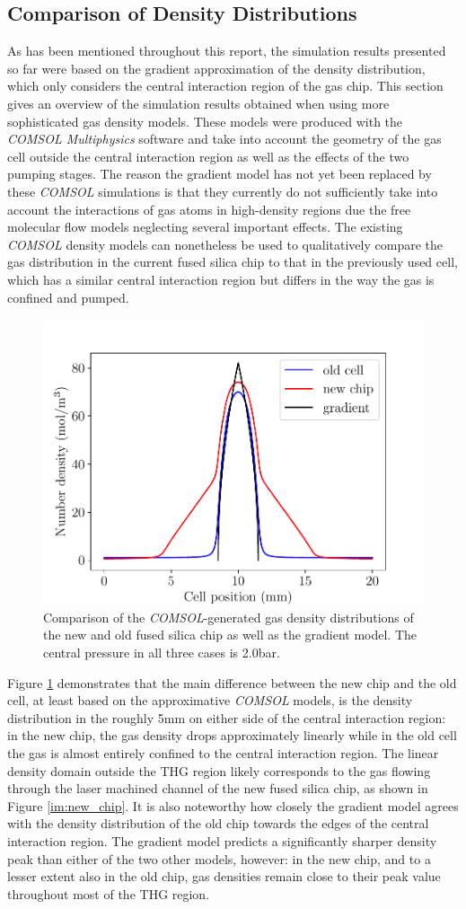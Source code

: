 \documentclass[a4paper]{jpconf}
\begin{document}
\subsection{Comparison of Density Distributions}
As has been mentioned throughout this report, the simulation results presented so far were based on the gradient approximation of the density distribution, which only considers the central interaction region of the gas chip. This section gives an overview of the simulation results obtained when using more sophisticated gas density models. These models were produced with the \textit{COMSOL Multiphysics} software and take into account the geometry of the gas cell outside the central interaction region as well as the effects of the two pumping stages. The reason the gradient model has not yet been replaced by these \textit{COMSOL} simulations is that they currently do not sufficiently take into account the interactions of gas atoms in high-density regions due the free molecular flow models neglecting several important effects. The existing \textit{COMSOL} density models can nonetheless be used to qualitatively compare the gas distribution in the current fused silica chip to that in the previously used cell, which has a similar central interaction region but differs in the way the gas is confined and pumped. \par 
\begin{figure}[h]
\centering
\includegraphics[width=0.5 \textwidth]{im/old_new_comp}
\caption{Comparison of the \textit{COMSOL}-generated gas density distributions of the new and old fused silica chip as well as the gradient model. The central pressure in all three cases is 2.0bar.}\label{im:dens}
\end{figure}
Figure \ref{im:dens} demonstrates that the main difference between the new chip and the old cell, at least based on the approximative \textit{COMSOL} models, is the density distribution in the roughly 5mm on either side of the central interaction region: in the new chip, the gas density drops approximately linearly while in the old cell the gas is almost entirely confined to the central interaction region. The linear density domain outside the THG region likely corresponds to the gas flowing through the laser machined channel of the new fused silica chip, as shown in Figure \ref{im:new_chip}. It is also noteworthy how closely the gradient model agrees with the density distribution of the old chip towards the edges of the central interaction region. The gradient model predicts a significantly sharper density peak than either of the two other models, however: in the new chip, and to a lesser extent also in the old chip, gas densities remain close to their peak value throughout most of the THG region. \par 
\end{document}

